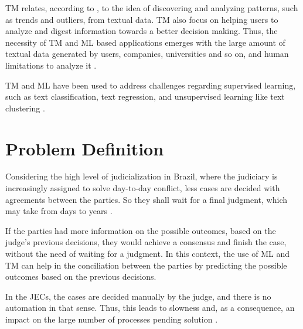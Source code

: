 TM relates, according to \textcite{Aggarwal2013},  to the idea of discovering and analyzing patterns, such as trends and outliers, from textual data. TM also focus on helping users to analyze and digest information towards a better decision making. Thus, the necessity of TM and ML based applications emerges with the large amount of textual data  generated by users, companies, universities and so on, and human limitations to analyze it \cite{Lecun2015, Khan2014}. 

TM and ML have been used to address challenges regarding supervised learning, such as text classification,  text regression, and unsupervised learning like text clustering \cite{Aggarwal2013, Trusov2016, Medvedeva2019, Zhang2019}. 



\section{Problem Definition} %



Considering the high level of judicialization in Brazil, where the judiciary is increasingly assigned to solve day-to-day conflict, less cases are decided with agreements between the parties. So they shall wait for a final judgment, which may take from days to years \cite{Cury2019, Mancuso2020}.


If the parties had more information on the possible outcomes, based on the judge's previous decisions, they would achieve a consensus and finish the case, without the need of waiting for a judgment. In this context, the use of ML and TM can help in the conciliation between the parties by predicting the possible outcomes based on the previous decisions.  


In the  JECs, the cases are decided manually by the judge, and there is no automation in that sense. Thus, this leads to slowness and, as a consequence, an impact on the large number of processes pending solution \cite{CNJ2020}. 

